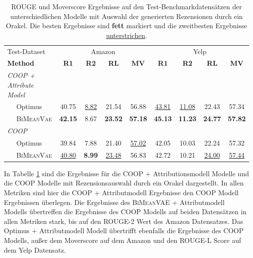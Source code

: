 \begin{table}[!h]
    \centering
    \begin{tabular}{@{}lcccc|cccc@{}}
    \toprule
             Test-Dataset                  & \multicolumn{4}{c}{Amazon} & \multicolumn{4}{c}{Yelp} \\ 
    \textbf{Method} & \textbf{R1} & \textbf{R2} & \textbf{RL} & \textbf{MV} & \textbf{R1} & \textbf{R2} & \textbf{RL} & \textbf{MV}\\ \midrule
      
    \textit{COOP + Attribute Model}        &         &         &        &        &        &   & &     \\
    $\quad$ Optimus                         & 40.75 & \underline{8.82} & 21.54 & 56.88 & \underline{43.81} & \underline{11.08} & 22.43 & 57.34 \\ 
    $\quad$ \textsc{BiMeanVae}              & \textbf{42.15} & 8.67 & \textbf{23.52} & \textbf{57.18} & \textbf{45.13} & \textbf{11.23} & \textbf{24.77} & \textbf{57.82} \\ \midrule
    
    \textit{COOP}                           &       &      &       &       &       &       &       &        \\ %
    $\quad$ Optimus                          & 39.84 & 7.88 & 21.40 & \underline{57.02} & 42.05 & 10.03 & 22.24 & 57.32\\ 
    $\quad$ \textsc{BiMeanVae}               & \underline{40.80} & \textbf{8.99} & \underline{23.48} & 56.83 & 42.72 & 10.21 & \underline{24.00} & \underline{57.44} \\ \bottomrule
    \end{tabular}
    \caption{ROUGE und Moverscore Ergebnisse auf den Test-Benchmarkdatensätzen der unterschiedlichen Modelle mit Auswahl der generierten Rezensionen durch ein Orakel. Die besten Ergebnisse sind \textbf{fett} markiert und die zweitbesten Ergebnisse \underline{unterstrichen}.}
    \label{oracle_results}
\end{table}

In Tabelle \ref{oracle_results} sind die Ergebnisse für die COOP + Attributionsmodell Modelle und die COOP Modelle mit Rezensionsauswahl durch ein Orakel dargestellt.
In allen Metriken sind hier die COOP + Attributmodell Ergebnisse den COOP Modell Ergebnissen überlegen. 
Die Ergebnisse des \textsc{BiMeanVAE} + Attributmodell Modells übertreffen die Ergebnisse des COOP Modells auf beiden Datensätzen in allen Metriken stark, bis auf den ROUGE-2 Wert des Amazon Datensatzes.
Das Optimus + Attributmodell Modell übertrifft ebenfalls die Ergebnisse des COOP Modells, außer dem Moverscore auf dem Amazon und den ROUGE-L Score auf dem Yelp Datensatz.

